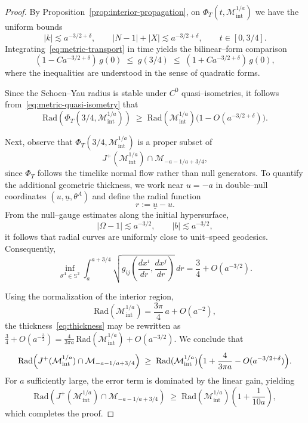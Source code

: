 \documentclass{amsart}
\newcommand{\ubar}{\underline{u}}
\begin{document}
{\begin{proof}
\noindent By Proposition~\ref{prop:interior-propagation}, on $\Phi_T(t,\mathcal M^{1/a}_{\mathrm{int}})$ we have the uniform bounds
\[
|k|\lesssim a^{-3/2+\delta},
\qquad
|N-1|+|X|\lesssim a^{-3/2+\delta},
\qquad t\in[0,3/4].
\]
Integrating~\eqref{eq:metric-transport} in time yields the bilinear--form comparison
\begin{equation}\label{eq:metric-quasi-isometry}
(1-Ca^{-3/2+\delta})\,g(0)
\;\le\;
g(3/4)
\;\le\;
(1+Ca^{-3/2+\delta})\,g(0),
\end{equation}
where the inequalities are understood in the sense of quadratic forms.

\noindent Since the Schoen--Yau radius is stable under $C^0$ quasi--isometries, it follows from~\eqref{eq:metric-quasi-isometry} that
\begin{equation}\label{eq:radius-transport}
\mathrm{Rad}\!\left(\Phi_T(3/4,\mathcal M^{1/a}_{\mathrm{int}})\right)
\;\ge\;
\mathrm{Rad}(\mathcal M^{1/a}_{\mathrm{int}})
\bigl(1-O(a^{-3/2+\delta})\bigr).
\end{equation}

\noindent Next, observe that $\Phi_T(3/4,\mathcal M^{1/a}_{\mathrm{int}})$ is a proper subset of
\[
J^+(\mathcal M^{1/a}_{\mathrm{int}})\cap \mathcal M_{-a-1/a+3/4},
\]
since $\Phi_T$ follows the timelike normal flow rather than null generators. To quantify the additional geometric thickness, we work near $u=-a$ in double--null coordinates $(u,\ubar,\theta^A)$ and define the radial function
\[
r:=\ubar-u.
\]
From the null--gauge estimates along the initial hypersurface,
\[
|\Omega-1|\lesssim a^{-3/2},
\qquad
|b|\lesssim a^{-3/2},
\]
it follows that radial curves are uniformly close to unit--speed geodesics. Consequently,
\begin{equation}\label{eq:thickness}
\inf_{\theta^A\in \mathbb{S}^{2}}
\int_{a}^{a+3/4}
\sqrt{g_{ij}\!\left(\frac{dx^i}{dr},\frac{dx^j}{dr}\right)}\,dr
=
\frac{3}{4}+O(a^{-3/2}).
\end{equation}

\noindent Using the normalization of the interior region,
\[
\mathrm{Rad}(\mathcal M^{1/a}_{\mathrm{int}})= \frac{3\pi}{4}\,a+O(a^{-2}),
\]
the thickness~\eqref{eq:thickness} may be rewritten as
$\frac{3}{4}+O(a^{-\frac{3}{2}})
=
\frac{4}{3\pi a}\,
\mathrm{Rad}(\mathcal M^{1/a}_{\mathrm{int}})
+O(a^{-3/2})$.
We conclude that
\[
\mathrm{Rad}\!\left(J^+(\mathcal M^{1/a}_{\mathrm{int}})\cap \mathcal M_{-a-1/a+3/4}\right)
\;\ge\;
\mathrm{Rad}(\mathcal M^{1/a}_{\mathrm{int}})
\Bigl(1+\frac{4}{3\pi a}-O(a^{-3/2+\delta})\Bigr).
\]
For $a$ sufficiently large, the error term is dominated by the linear gain, yielding
\[
\mathrm{Rad}\!\left(J^+(\mathcal M^{1/a}_{\mathrm{int}})\cap \mathcal M_{-a-1/a+3/4}\right)
\;\ge\;
\mathrm{Rad}(\mathcal M^{1/a}_{\mathrm{int}})
\left(1+\frac{1}{10a}\right),
\]
which completes the proof.
\end{proof}




}
\end{document}

